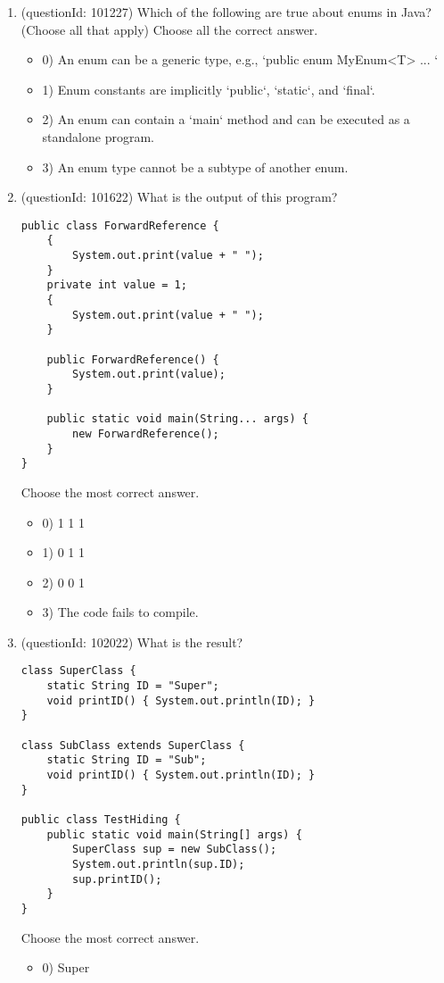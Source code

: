 \documentclass[12pt]{article}
\begin{document}
\begin{enumerate}[label=(\arabic*)]
\begin{itemize}
\end{itemize}
\item (questionId: 101227) Which of the following are true about enums in Java? (Choose all that apply)
Choose all the correct answer.\begin{itemize}
\item 0) An enum can be a generic type, e.g., `public enum MyEnum<T> { ... }`

\item 1) Enum constants are implicitly `public`, `static`, and `final`.

\item 2) An enum can contain a `main` method and can be executed as a standalone program.

\item 3) An enum type cannot be a subtype of another enum.

\end{itemize}
\item (questionId: 101622) What is the output of this program?\n\begin{verbatim}
public class ForwardReference {
    {
        System.out.print(value + " ");
    }
    private int value = 1;
    {
        System.out.print(value + " ");
    }

    public ForwardReference() {
        System.out.print(value);
    }

    public static void main(String... args) {
        new ForwardReference();
    }
}
\end{verbatim}
Choose the most correct answer. 
\begin{itemize}
\item 0) 1 1 1

\item 1) 0 1 1

\item 2) 0 0 1

\item 3) The code fails to compile.

\end{itemize}
\item (questionId: 102022) What is the result?
\begin{verbatim}
class SuperClass {
    static String ID = "Super";
    void printID() { System.out.println(ID); }
}

class SubClass extends SuperClass {
    static String ID = "Sub";
    void printID() { System.out.println(ID); }
}

public class TestHiding {
    public static void main(String[] args) {
        SuperClass sup = new SubClass();
        System.out.println(sup.ID);
        sup.printID();
    }
}
\end{verbatim}
Choose the most correct answer. 
\begin{itemize}
\item 0) Super\nSub


\end{itemize}
\end{enumerate}
\end{document}
